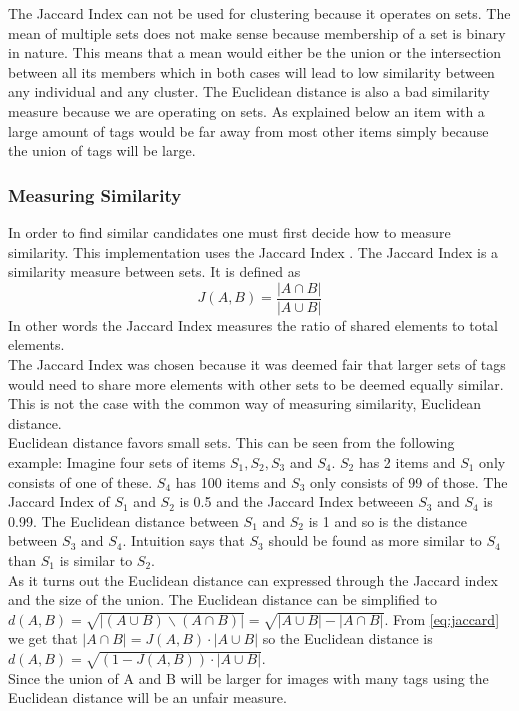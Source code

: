\documentclass[conference]{IEEETran}
\begin{document}
The Jaccard Index can not be used for clustering because it operates on sets. The mean of multiple sets does not make sense because membership of a set is binary in nature. This means that a mean would either be the union or the intersection between all its members which in both cases will lead to low similarity between any individual and any cluster.
The Euclidean distance is also a bad similarity measure because we are operating on sets. As explained below an item with a large amount of tags would be far away from most other items simply because the union of tags will be large.

\subsubsection{Measuring Similarity}
\label{sec:sim}
In order to find similar candidates one must first decide how to measure similarity. This implementation uses the Jaccard Index \cite{jaccard1912distribution}. The Jaccard Index is a similarity measure between sets. It is defined as
\begin{equation}
\label{eq:jaccard}
J(A,B) = \frac{|A \cap B|}{|A \cup B|}
\end{equation}
In other words the Jaccard Index measures the ratio of shared elements to total elements.\\
The Jaccard Index was chosen because it was deemed fair that larger sets of tags would need to share more elements with other sets to be deemed equally similar. This is not the case with the common way of measuring similarity, Euclidean distance.\\
Euclidean distance favors small sets. This can be seen from the following example: Imagine four sets of items $S_1, S_2, S_3$ and $S_4$. $S_2$ has 2 items and $S_1$ only consists of one of these. $S_4$ has 100 items and $S_3$  only consists of 99 of those. The Jaccard Index of $S_1$ and $S_2$ is 0.5 and the Jaccard Index betweeen $S_3$ and $S_4$ is 0.99. The Euclidean distance between $S_1$ and $S_2$ is 1 and so is the distance between $S_3$ and $S_4$. Intuition says that $S_3$ should be found as more similar to $S_4$ than $S_1$ is similar to $S_2$.\\
As it turns out the Euclidean distance can expressed through the Jaccard index and the size of the union. The Euclidean distance can be simplified to $d(A,B) = \sqrt{|(A \cup B) \backslash (A \cap B)|} = \sqrt{|A \cup B| - |A \cap B|}$. From \autoref{eq:jaccard} we get that $|A \cap B| = J(A,B) \cdot |A \cup B|$ so the Euclidean distance is $d(A,B) = \sqrt{(1 - J(A,B)) \cdot |A \cup B|}$.\\
Since the union of A and B will be larger for images with many tags using the Euclidean distance will be an unfair measure.
\end{document}
